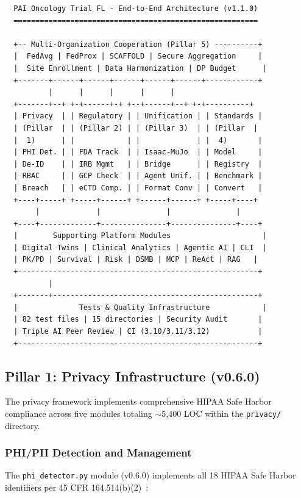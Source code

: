 \documentclass[10pt]{article}
\begin{document}
\begin{verbatim}
  PAI Oncology Trial FL - End-to-End Architecture (v1.1.0)
  ========================================================

  +-- Multi-Organization Cooperation (Pillar 5) ----------+
  |  FedAvg | FedProx | SCAFFOLD | Secure Aggregation     |
  |  Site Enrollment | Data Harmonization | DP Budget      |
  +-------+------+------+------+------+------+------------+
          |      |      |      |      |
  +-------+--+ +-+------+-+ +--+------+--+ +-+----------+
  | Privacy  | | Regulatory | | Unification | | Standards |
  | (Pillar  | | (Pillar 2) | | (Pillar 3)  | | (Pillar  |
  |  1)      | |            | |             | |  4)       |
  | PHI Det. | | FDA Track  | | Isaac-MuJo  | | Model     |
  | De-ID    | | IRB Mgmt   | | Bridge      | | Registry  |
  | RBAC     | | GCP Check  | | Agent Unif. | | Benchmark |
  | Breach   | | eCTD Comp. | | Format Conv | | Convert   |
  +----+-----+ +-----+------+ +------+------+ +-----+----+
       |             |               |               |
  +----+-------------+---------------+---------------+----+
  |        Supporting Platform Modules                     |
  | Digital Twins | Clinical Analytics | Agentic AI | CLI  |
  | PK/PD | Survival | Risk | DSMB | MCP | ReAct | RAG   |
  +-------------------------------------------------------+
          |
  +-------+-----------------------------------------------+
  |              Tests & Quality Infrastructure            |
  | 82 test files | 15 directories | Security Audit       |
  | Triple AI Peer Review | CI (3.10/3.11/3.12)           |
  +-------------------------------------------------------+
\end{verbatim}

\subsection{Pillar 1: Privacy Infrastructure (v0.6.0)}
\label{sec:privacy}

The privacy framework implements comprehensive HIPAA Safe Harbor compliance across five modules totaling $\sim$5,400 LOC within the \texttt{privacy/} directory.

\subsubsection{PHI/PII Detection and Management}

The \texttt{phi\_detector.py} module (v0.6.0) implements all 18 HIPAA Safe Harbor identifiers per 45 CFR 164.514(b)(2)~\cite{hipaa_safeharbor}:
\end{document}
